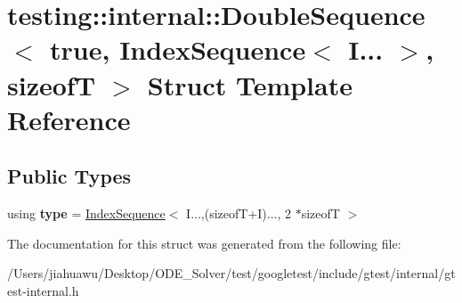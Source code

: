 \hypertarget{structtesting_1_1internal_1_1_double_sequence_3_01true_00_01_index_sequence_3_01_i_8_8_8_01_4_00_01sizeof_t_01_4}{}\section{testing\+:\+:internal\+:\+:Double\+Sequence$<$ true, Index\+Sequence$<$ I... $>$, sizeofT $>$ Struct Template Reference}
\label{structtesting_1_1internal_1_1_double_sequence_3_01true_00_01_index_sequence_3_01_i_8_8_8_01_4_00_01sizeof_t_01_4}
\subsection*{Public Types}
\begin{DoxyCompactItemize}
\item 
\mbox{\label{structtesting_1_1internal_1_1_double_sequence_3_01true_00_01_index_sequence_3_01_i_8_8_8_01_4_00_01sizeof_t_01_4_a6f0fbcc14f5264c7db52f3ba3e264545}} 
using {\bfseries type} = \mbox{\hyperlink{structtesting_1_1internal_1_1_index_sequence}{Index\+Sequence}}$<$ I...,(sizeofT+I)..., 2 $\ast$sizeofT $>$
\end{DoxyCompactItemize}


The documentation for this struct was generated from the following file\+:\begin{DoxyCompactItemize}
\item 
/\+Users/jiahuawu/\+Desktop/\+O\+D\+E\+\_\+\+Solver/test/googletest/include/gtest/internal/gtest-\/internal.\+h\end{DoxyCompactItemize}
